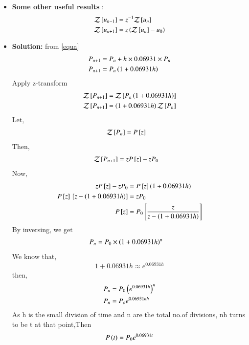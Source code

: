 \documentclass[journal]{IEEEtran}
\numberwithin{equation}{enumi}
\numberwithin{figure}{enumi}
\begin{document}
\begin{itemize}
	\item \textbf{Some other useful results} : \\
		\begin{align}
			\mathcal{Z}{}\left[u_{n-1}\right] &= z^{-1} \mathcal{Z}{}\left[u_{n}\right] \\
			\mathcal{Z}{}\left[u_{n+1}\right] &= z \left(\mathcal{Z}{}\left[u_{n}\right] - u_{0}\right)
		\end{align}
        \item \textbf{Solution:}
        from \eqref{equa}
        \begin{align}
            P_{n+1} &= P_{n}+h \times 0.06931 \times P_n\\
            P_{n+1} &= P_{n}\left(1 + 0.06931h\right)
        \end{align}
        Apply z-transform
        \begin{align}
            \mathcal{Z}{}\left[P_{n+1}\right] &= \mathcal{Z}{}\left[P_{n}\left(1 + 0.06931h\right)\right]\\
            \mathcal{Z}{}\left[P_{n+1}\right] &= \left(1+0.06931h\right)\mathcal{Z}{}\left[P_{n}\right]
        \end{align}
        Let,
        \begin{align}
            \mathcal{Z}{}\left[P_n\right] &=P{}\left[z\right]
        \end{align}
    Then,
        \begin{align}
            \mathcal{Z}{}\left[P_{n+1}\right] &=zP{}\left[z\right]-zP_0
        \end{align}
    Now,
        \begin{align}
            zP{}\left[z\right]-zP_0 &= P{}\left[z\right](1+0.06931h) \\
            P{}\left[z\right] {}\left[z-\left(1+0.06931h\right)\right] &= zP_0 \\
            P{}\left[z\right] &= P_0 {}\left[\frac{z}{z-\left(1+0.06931h\right)}\right]
        \end{align}
    By inversing, we get 
        \begin{align}
            P_n &= P_0 \times \left(1+0.06931h\right)^n
        \end{align}
    We know that,
        \begin{align}
            1+0.06931h \approx e^{0.06931h}
        \end{align}
    then,
        \begin{align}
            P_n &= P_0 \left(e^{0.06931h}\right)^n \\
            P_n &= P_o e^{0.06931nh}
        \end{align}
        As h is the small division of time and n are the total no.of divisions, nh turns to be t at that point,Then
        \begin{align}
            P\left(t\right)=P_0e^{0.06931t}
        \end{align}
\end{itemize}
\end{document}

